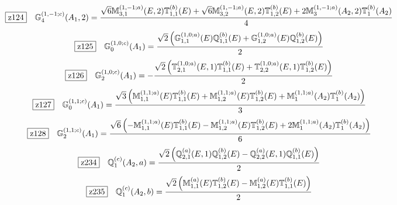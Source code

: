 \documentclass[fleqn,10pt,landscape]{jsarticle}
\begin{document}
\begin{dmath*}
\hspace*{3mm}\fbox{z124}\quad \mathbb{G}_{4}^{(1,-1;c)}(A_{1},2)=\frac{\sqrt{6} \mathbb{M}_{3,1}^{(1,-1;a)}(E,2) \mathbb{T}_{1,1}^{(b)}(E) + \sqrt{6} \mathbb{M}_{3,2}^{(1,-1;a)}(E,2) \mathbb{T}_{1,2}^{(b)}(E) + 2 \mathbb{M}_{3}^{(1,-1;a)}(A_{2},2) \mathbb{T}_{1}^{(b)}(A_{2})}{4}
\end{dmath*}
\begin{dmath*}
\hspace*{3mm}\fbox{z125}\quad \mathbb{G}_{0}^{(1,0;c)}(A_{1})=\frac{\sqrt{2} \left(\mathbb{G}_{1,1}^{(1,0;a)}(E) \mathbb{Q}_{1,1}^{(b)}(E) + \mathbb{G}_{1,2}^{(1,0;a)}(E) \mathbb{Q}_{1,2}^{(b)}(E)\right)}{2}
\end{dmath*}
\begin{dmath*}
\hspace*{3mm}\fbox{z126}\quad \mathbb{G}_{2}^{(1,0;c)}(A_{1})=- \frac{\sqrt{2} \left(\mathbb{T}_{2,1}^{(1,0;a)}(E,1) \mathbb{T}_{1,1}^{(b)}(E) + \mathbb{T}_{2,2}^{(1,0;a)}(E,1) \mathbb{T}_{1,2}^{(b)}(E)\right)}{2}
\end{dmath*}
\begin{dmath*}
\hspace*{3mm}\fbox{z127}\quad \mathbb{G}_{0}^{(1,1;c)}(A_{1})=\frac{\sqrt{3} \left(\mathbb{M}_{1,1}^{(1,1;a)}(E) \mathbb{T}_{1,1}^{(b)}(E) + \mathbb{M}_{1,2}^{(1,1;a)}(E) \mathbb{T}_{1,2}^{(b)}(E) + \mathbb{M}_{1}^{(1,1;a)}(A_{2}) \mathbb{T}_{1}^{(b)}(A_{2})\right)}{3}
\end{dmath*}
\begin{dmath*}
\hspace*{3mm}\fbox{z128}\quad \mathbb{G}_{2}^{(1,1;c)}(A_{1})=\frac{\sqrt{6} \left(- \mathbb{M}_{1,1}^{(1,1;a)}(E) \mathbb{T}_{1,1}^{(b)}(E) - \mathbb{M}_{1,2}^{(1,1;a)}(E) \mathbb{T}_{1,2}^{(b)}(E) + 2 \mathbb{M}_{1}^{(1,1;a)}(A_{2}) \mathbb{T}_{1}^{(b)}(A_{2})\right)}{6}
\end{dmath*}
\begin{dmath*}
\hspace*{3mm}\fbox{z234}\quad \mathbb{Q}_{1}^{(c)}(A_{2},a)=\frac{\sqrt{2} \left(\mathbb{Q}_{2,1}^{(a)}(E,1) \mathbb{Q}_{1,2}^{(b)}(E) - \mathbb{Q}_{2,2}^{(a)}(E,1) \mathbb{Q}_{1,1}^{(b)}(E)\right)}{2}
\end{dmath*}
\begin{dmath*}
\hspace*{3mm}\fbox{z235}\quad \mathbb{Q}_{1}^{(c)}(A_{2},b)=\frac{\sqrt{2} \left(\mathbb{M}_{1,1}^{(a)}(E) \mathbb{T}_{1,2}^{(b)}(E) - \mathbb{M}_{1,2}^{(a)}(E) \mathbb{T}_{1,1}^{(b)}(E)\right)}{2}
\end{dmath*}
\end{document}
